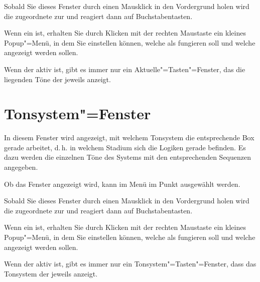 Sobald Sie dieses Fenster durch einen Mausklick in den Vordergrund
holen wird die zugeordnete  zur
 und reagiert dann auf
Buchstabentasten.


Wenn ein 
 ist, erhalten Sie durch Klicken
mit der rechten Maustaste ein kleines Popup"=Menü, in dem Sie
einstellen können, welche  als
 fungieren soll und welche
 angezeigt werden sollen.


Wenn der  aktiv ist, gibt es immer 
nur ein Aktuelle"=Tasten"=Fenster, das die liegenden Töne der 
jeweils  anzeigt.


\section{Tonsystem"=Fenster}\label{sec:DE_TS}
In diesem Fenster wird angezeigt, mit welchem Tonsystem die
entsprechende Box gerade arbeitet, d.\,h. in welchem Stadium sich die
Logiken gerade befinden. Es dazu werden die einzelnen Töne des Systems
mit den entsprechenden Sequenzen angegeben.


Ob das Fenster angezeigt wird, kann im Menü  
im Punkt  ausgewählt werden.


Sobald Sie dieses Fenster durch einen Mausklick in den Vordergrund
holen wird die zugeordnete  zur
 und reagiert dann auf
Buchstabentasten.


Wenn ein 
 ist, erhalten Sie durch Klicken
mit der rechten Maustaste ein kleines Popup"=Menü, in dem Sie
einstellen können, welche  als
 fungieren soll und welche
 angezeigt werden sollen.


Wenn der  aktiv ist, gibt es
immer nur ein Tonsystem"=Tasten"=Fenster, dass das Tonsystem der
jeweils  anzeigt.




